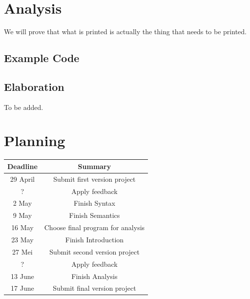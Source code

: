 \documentclass{article}
\begin{document}
\section{Analysis}
We will prove that what is printed is actually the thing that needs to be printed.
\subsection{Example Code}

\subsection{Elaboration}
To be added. %
\newpage
\appendix
\section{Planning}
\begin{tabular}{|c|c|}
\hline
 Deadline   &  Summary \\
 \hline
    29 April & Submit first version project \\
    ? & Apply feedback \\
   2 May & Finish Syntax\\
   9 May & Finish Semantics\\
   16 May & Choose final program for analysis\\
      23 May & Finish Introduction\\
    27 Mei & Submit second version project \\
    ? & Apply feedback \\
    13 June & Finish Analysis\\
    17 June & Submit final version project \\
    \hline
\end{tabular}

\end{document}

